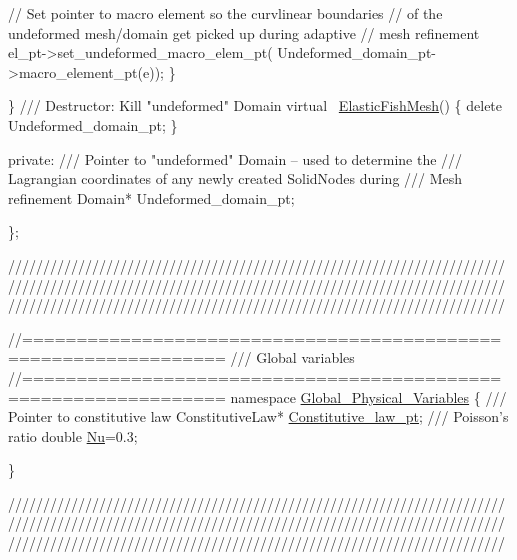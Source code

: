\begin{DoxyCodeInclude}
     \textcolor{comment}{// Set pointer to macro element so the curvlinear boundaries}
     \textcolor{comment}{// of the undeformed mesh/domain get picked up during adaptive}
     \textcolor{comment}{// mesh refinement}
     el\_pt->set\_undeformed\_macro\_elem\_pt(
      Undeformed\_domain\_pt->macro\_element\_pt(e));
    \}
   
  \}
\textcolor{comment}{}
\textcolor{comment}{ /// Destructor: Kill "undeformed" Domain}
\textcolor{comment}{} \textcolor{keyword}{virtual} ~\hyperlink{classElasticFishMesh}{ElasticFishMesh}()
  \{
   \textcolor{keyword}{delete} Undeformed\_domain\_pt;
  \}

\textcolor{keyword}{private}:
\textcolor{comment}{}
\textcolor{comment}{ /// Pointer to "undeformed" Domain -- used to determine the}
\textcolor{comment}{ /// Lagrangian coordinates of any newly created SolidNodes during}
\textcolor{comment}{ /// Mesh refinement}
\textcolor{comment}{} Domain* Undeformed\_domain\_pt;

\};



\textcolor{comment}{}
\textcolor{comment}{///////////////////////////////////////////////////////////////////////}
\textcolor{comment}{///////////////////////////////////////////////////////////////////////}
\textcolor{comment}{///////////////////////////////////////////////////////////////////////}
\textcolor{comment}{}



\textcolor{comment}{//================================================================}\textcolor{comment}{}
\textcolor{comment}{/// Global variables}
\textcolor{comment}{}\textcolor{comment}{//================================================================}
\textcolor{keyword}{namespace }\hyperlink{namespaceGlobal__Physical__Variables}{Global\_Physical\_Variables}
\{\textcolor{comment}{}
\textcolor{comment}{ /// Pointer to constitutive law}
\textcolor{comment}{} ConstitutiveLaw* \hyperlink{namespaceGlobal__Physical__Variables_a5d5f19442938130d36ee7476ae25049c}{Constitutive\_law\_pt};
\textcolor{comment}{}
\textcolor{comment}{ /// Poisson's ratio}
\textcolor{comment}{} \textcolor{keywordtype}{double} \hyperlink{namespaceGlobal__Physical__Variables_a3962c36313826b19f216f6bbbdd6a477}{Nu}=0.3;

\}

\textcolor{comment}{}
\textcolor{comment}{///////////////////////////////////////////////////////////////////////}
\textcolor{comment}{///////////////////////////////////////////////////////////////////////}
\textcolor{comment}{///////////////////////////////////////////////////////////////////////}
\textcolor{comment}{}



\end{DoxyCodeInclude}

